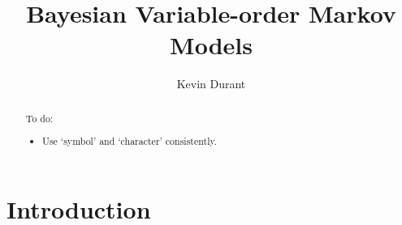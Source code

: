 \documentclass[12pt,a4paper]{article}
\title{Bayesian Variable-order Markov Models}
\author{Kevin Durant}
\date{}
\begin{document}
\maketitle

\begin{abstract}
To do:
\begin{itemize}
  \item Use `symbol' and `character' consistently.
\end{itemize}
\end{abstract}

\section{Introduction} %



\end{document}

